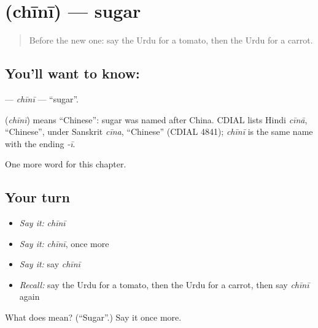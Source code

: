 \section[\texorpdfstring{\ur{چینی} (chīnī)}{چینی (chīnī)}]{ (chīnī) — sugar}

\label{lesson:UR-C55-chini}



\begin{quote}
Before the new one: say the Urdu for a tomato, then the Urdu for a carrot.
\end{quote}

\subsection*{You'll want to know: }
\textbf{} — \emph{chīnī} — \textquotedblleft{}sugar\textquotedblright{}.

\begin{cousinweb}
\textbf{} (\emph{chīnī}) means \textquotedblleft{}Chinese\textquotedblright{}: sugar was named after China. CDIAL lists Hindi \emph{cīnā}, \textquotedblleft{}Chinese\textquotedblright{}, under Sanskrit \emph{cīna}, \textquotedblleft{}Chinese\textquotedblright{} (CDIAL 4841); \emph{chīnī} is the same name with the ending \emph{-ī}.
\end{cousinweb}

\begin{grammarlens}[title={What you've built}]
One more word for this chapter.
\end{grammarlens}

\subsection*{Your turn}
\begin{itemize}
\raggedright
  \item \emph{Say it:} \emph{chīnī}
  \item \emph{Say it:} \emph{chīnī}, once more
  \item \emph{Say it:} say \emph{chīnī}
  \item \emph{Recall:} say the Urdu for a tomato, then the Urdu for a carrot, then say \emph{chīnī} again
\end{itemize}

\begin{tcolorbox}[breakable,colback=teal!4,colframe=teal!35!black,title={Before you move on}]
What does  mean? (\textquotedblleft{}Sugar\textquotedblright{}.) Say it once more.
\end{tcolorbox}
